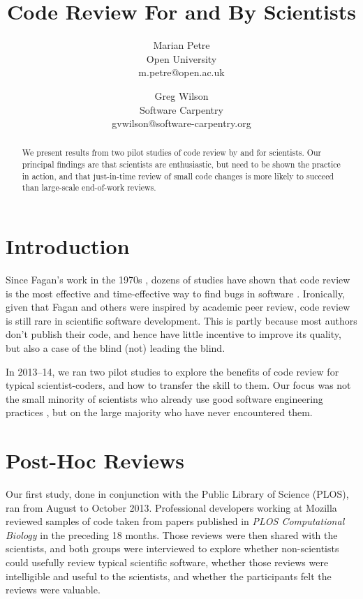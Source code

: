 \documentclass[10pt,twocolumn]{article}
\begin{document}
\title{Code Review For and By Scientists}
\author{
  Marian Petre \\ {\small Open University} \\ {\small m.petre@open.ac.uk}
  \and
  Greg Wilson \\ {\small Software Carpentry} \\ {\small gvwilson@software-carpentry.org}
}

\maketitle

\begin{abstract}

We present results from two pilot studies of code review by and for scientists.
Our principal findings are that scientists are enthusiastic,
but need to be shown the practice in action,
and that just-in-time review of small code changes is more likely to succeed
than large-scale end-of-work reviews.

\end{abstract}

\section{Introduction}

Since Fagan's work in the 1970s \cite{b:fagan1976,b:fagan1986},
dozens of studies have shown that code review is
the most effective and time-effective way to find bugs in software \cite{b:cohen2010,b:bacchelli2013}.
Ironically,
given that Fagan and others were inspired by academic peer review,
code review is still rare in scientific software development.
This is partly because most authors don't publish their code,
and hence have little incentive to improve its quality,
but also a case of the blind (not) leading the blind.

In 2013--14,
we ran two pilot studies to explore the benefits of code review for typical scientist-coders,
and how to transfer the skill to them.
Our focus was not the small minority of scientists who already use good software engineering practices \cite{b:hannay2009},
but on the large majority who have never encountered them.

\section{Post-Hoc Reviews}

Our first study,
done in conjunction with the Public Library of Science (PLOS),
ran from August to October 2013.
Professional developers working at Mozilla reviewed samples of code
taken from papers published in \emph{PLOS Computational Biology} in the preceding 18 months.
Those reviews were then shared with the scientists,
and both groups were interviewed to explore
whether non-scientists could usefully review typical scientific software,
whether those reviews were intelligible and useful to the scientists,
and whether the participants felt the reviews were valuable.
\end{document}
